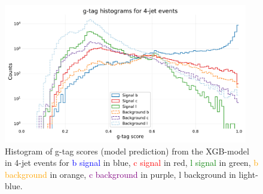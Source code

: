 \documentclass[a4paper, twoside, nobib]{tufte-book}
\begin{document}
\begin{figure}
  \includegraphics[width=0.95\textwidth, trim=10 10 10 40, clip]{figures/quarks/gtag-histogram-sigbkg-down_sample=1.00-ML_vars=vertex-selection=b-ejet_min=4-n_iter_RS_lgb=99-n_iter_RS_xgb=9-cdot_cut=0.90-version=19-njet=4.pdf}
  \caption[g-tag scores in 4-jet events for signal and background]
          {Histogram of g-tag scores (model prediction) from the XGB-model in 4-jet events for \textcolor{blue}{b signal} in blue, \textcolor{red}{c signal} in red, \textcolor{green}{l signal} in green, \textcolor{orange}{b background} in orange, \textcolor{purple}{c background} in purple, \textcolor{light-blue}{l background} in light-blue.
          } 
  \label{fig:q:gtag_scores_4j_sig_bkg}
\end{figure}
\end{document}

